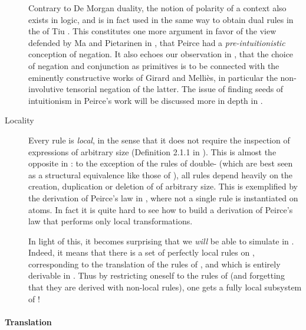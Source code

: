 \begin{scope}
\begin{description}
    \begin{remark}
      
    Contrary to De Morgan duality, the notion of polarity of a context also
    exists in  logic, and is in fact used in the same way to
    obtain dual rules in the    of
    Tiu \cite{tiu_local_2006}. This constitutes one more argument in favor of
    the view defended by Ma and Pietarinen in ,
    that Peirce had a \emph{pre-intuitionistic} conception of negation. It also
    echoes our observation in , that the choice of
    negation and conjunction as primitives is to be connected with the eminently
    constructive works of Girard and Melliès, in particular the non-involutive
    tensorial negation of the latter. The issue of finding seeds of intuitionism
    in Peirce's work will be discussed more in depth in .
    \end{remark}

  \item[Locality]
    Every rule is \emph{local}, in the sense that it does not require the
    inspection of expressions of arbitrary size (Definition 2.1.1 in
    \cite{tubella:hal-02390267}). This is almost the opposite in : to
    the exception of the rules of double- (which are best seen as a
    structural equivalence like those of ), all rules depend heavily on the
    creation, duplication or deletion of  of arbitrary size. This is
    exemplified by the derivation of Peirce's law in ,
    where not a single rule is instantiated on atoms. In fact it is quite hard
    to see how to build a derivation of Peirce's law that performs only local
    transformations.
    
    In light of this, it becomes surprising that we \emph{will} be able to
    simulate  in . Indeed, it means that there is a set
     of perfectly local rules on , corresponding to the
    translation of the rules of , and which is entirely derivable in
    . Thus by restricting oneself to the rules of 
    (and forgetting that they are derived with non-local rules), one gets a
    fully local subsystem of !
\end{description}

\paragraph{Translation}


\end{scope}
